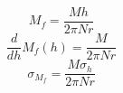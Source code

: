 \[\displaystyle M_{f} = \frac{M h}{2 \pi N r}\]
\[\displaystyle \frac{d}{d h} M_{f}{\left(h \right)} = \frac{M}{2 \pi N r}\]
\[\displaystyle \sigma_{M_f} = \frac{M \sigma_{h}}{2 \pi N r}\]
